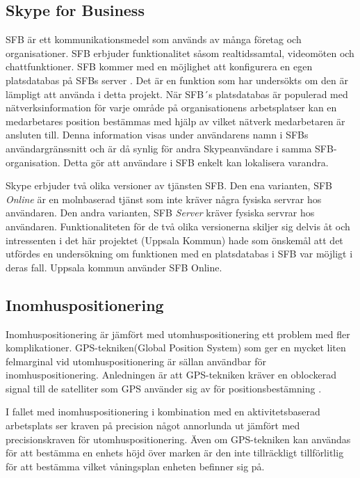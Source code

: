 \documentclass[swedish, a4paper,12pt]{article}
\begin{document}
\subsection{Skype for Business}
SFB är ett kommunikationsmedel som används av många företag och organisationer. SFB erbjuder funktionalitet såsom realtidssamtal, videomöten och chattfunktioner. SFB kommer med en möjlighet att konfigurera en egen platsdatabas på SFBs server \cite{Microsoft-Office}. Det är en funktion som har undersökts om den är lämpligt att använda i detta projekt. När SFB´s platsdatabas är populerad med nätverksinformation för varje område på organisationens arbetsplatser kan en medarbetares position bestämmas med hjälp av vilket nätverk medarbetaren är ansluten till. Denna information visas under användarens namn i SFBs användargränssnitt och är då synlig för andra Skypeanvändare i samma SFB-organisation. Detta gör att användare i SFB enkelt kan lokalisera varandra.

Skype erbjuder två olika versioner av tjänsten SFB. Den ena varianten, SFB \textit{Online} är en molnbaserad tjänst som inte kräver några fysiska servrar hos användaren\cite{SFBonline}.
Den andra varianten, SFB \textit{Server} kräver fysiska servrar hos användaren\cite{SFBserver}. Funktionaliteten för de två olika versionerna skiljer sig delvis åt och intressenten i det här projektet (Uppsala Kommun) hade som önskemål att det utfördes en undersökning om funktionen med en platsdatabas i SFB var möjligt i deras fall. Uppsala kommun använder SFB Online.

\subsection{Inomhuspositionering}
Inomhuspositionering är jämfört med utomhuspositionering ett problem med fler komplikationer. GPS-tekniken(Global Position System) som ger en mycket liten felmarginal vid utomhuspositionering är sällan användbar för inomhuspositionering. Anledningen är att GPS-tekniken kräver en oblockerad signal till de satelliter som GPS använder sig av för positionsbestämning \cite{GPS_US_ACCURACY}.

I fallet med inomhuspositionering i kombination med en aktivitetsbaserad arbetsplats ser kraven på precision något annorlunda ut jämfört med precisionskraven för utomhuspositionering. Även om GPS-tekniken kan användas för att bestämma en enhets höjd över marken är den inte tillräckligt tillförlitlig för att bestämma vilket våningsplan enheten befinner sig på.
\end{document}
